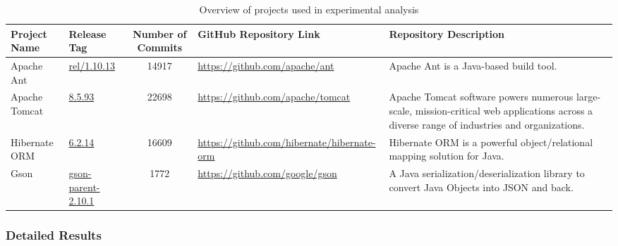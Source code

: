 \documentclass{ieeeaccess}
\begin{document}
\begin{table}[h]
\centering
\caption{Overview of projects used in experimental analysis}
\label{tab:project_info}
\setlength{\tabcolsep}{5pt} 
\renewcommand{\arraystretch}{1.2} 
\begin{tabular}{|l|l|c|l|p{4cm}|}
\hline
\textbf{Project Name} & \textbf{Release Tag} & \textbf{Number of Commits} & \textbf{GitHub Repository Link} & \textbf{Repository Description} \\ \hline
Apache Ant & \href{https://github.com/apache/ant/tree/rel/1.10.13}{rel/1.10.13} & 14917 & \href{https://github.com/apache/ant}{https://github.com/apache/ant} & Apache Ant is a Java-based build tool. \\ \hline
Apache Tomcat & \href{https://github.com/apache/tomcat/tree/8.5.93}{8.5.93} & 22698 & \href{https://github.com/apache/tomcat}{https://github.com/apache/tomcat} & Apache Tomcat software powers numerous large-scale, mission-critical web applications across a diverse range of industries and organizations. \\ \hline
Hibernate ORM & \href{https://github.com/hibernate/hibernate-orm/tree/6.2.14}{6.2.14} & 16609 & \href{https://github.com/hibernate/hibernate-orm}{https://github.com/hibernate/hibernate-orm} & Hibernate ORM is a powerful object/relational mapping solution for Java. \\ \hline
Gson & \href{https://github.com/google/gson/tree/gson-parent-2.10.1}{gson-parent-2.10.1} & 1772 & \href{https://github.com/google/gson}{https://github.com/google/gson} & A Java serialization/deserialization library to convert Java Objects into JSON and back. \\ \hline
\end{tabular}
\end{table}

\subsubsection{Detailed Results}
\end{document}
